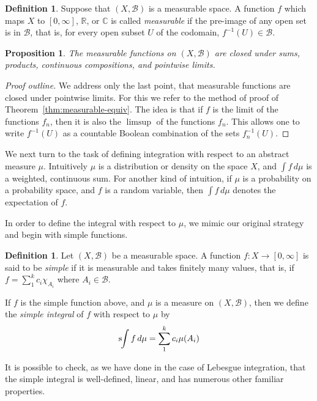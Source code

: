 \documentclass[11pt,oneside]{amsbook}
\newcommand{\RR}{{\mathbb R}}
\newcommand{\CC}{{\mathbb C}}
\newcommand{\sint}{\text{s}\kern-3pt\int}
\theoremstyle{definition}
\theoremstyle{plain}
\newtheorem{prop}[thm]{Proposition}
\theoremstyle{definition}
\newtheorem{defn}[thm]{Definition}
\theoremstyle{remark}
\numberwithin{equation}{section}
\numberwithin{figure}{section}
\begin{document}
\begin{defn}
  Suppose that $(X,\mathcal B)$ is a measurable space. A function $f$ which maps $X$ to $[0,\infty]$, $\RR$, or $\CC$ is called \emph{measurable} if the pre-image of any open set is in $\mathcal B$, that is, for every open subset $U$ of the codomain, $f^{-1}(U)\in\mathcal B$.
\end{defn}

\begin{prop}
  The measurable functions on $(X,\mathcal B)$ are closed under sums, products, continuous compositions, and pointwise limits.
\end{prop}

\begin{proof}[Proof outline]
  We address only the last point, that measurable functions are closed under pointwise limits. For this we refer to the method of proof of Theorem~\ref{thm:measurable-equiv}. The idea is that if $f$ is the limit of the functions $f_n$, then it is also the $\limsup$ of the functions $f_n$. This allows one to write $f^{-1}(U)$ as a countable Boolean combination of the sets $f_n^{-1}(U)$.
\end{proof}

We next turn to the task of defining integration with respect to an abstract measure $\mu$. Intuitively $\mu$ is a distribution or density on the space $X$, and $\int f\,d\mu$ is a weighted, continuous sum. For another kind of intuition, if $\mu$ is a probability on a probability space, and $f$ is a random variable, then $\int f\,d\mu$ denotes the expectation of $f$.

In order to define the integral with respect to $\mu$, we mimic our original strategy and begin with simple functions.

\begin{defn}
  Let $(X,\mathcal B)$ be a measurable space. A function $f\colon X\to[0,\infty]$ is said to be \emph{simple} if it is measurable and takes finitely many values, that is, if $f=\sum_1^kc_i\chi_{A_i}$ where $A_i\in\mathcal B$.

  If $f$ is the simple function above, and $\mu$ is a measure on $(X,\mathcal B)$, then we define the \emph{simple integral} of $f$ with respect to $\mu$ by
  \[\sint f\,d\mu=\sum_1^kc_i\mu(A_i)
  \]
\end{defn}

It is possible to check, as we have done in the case of Lebesgue integration, that the simple integral is well-defined, linear, and has numerous other familiar properties.
\end{document}
